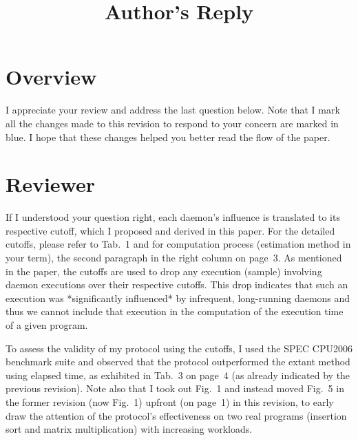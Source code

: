 \documentclass[10pt,letterpaper]{article}
\newenvironment{myindentpar}[1]%
{\begin{list}{}
         {\vspace{10pt}
					\setlength{\leftmargin}{#1}}
          \item[]
}
{\end{list}}
\newcommand{\rev}[1]{\begin{myindentpar}{.25in} {\em {\color{blue}{#1}}}\end{myindentpar}}
\begin{document}
\title{Author's Reply}
\author{}
\maketitle

\section*{Overview}\label{sec:overview}
I appreciate your review and address the last question below. 
Note that I mark all the changes made to this revision to respond to your concern are marked in {\color{blue}blue}. 
I hope that these changes helped you better read the flow of the paper. 



\clearpage
\section*{Reviewer}\label{sec:rev1}

\rev{
$<<$ Reviewer's comments to the author(s) $>>$

The manuscript is well revised.

However, I have a question how to estimate each daemon's influence as time.
The estimation is important for accuracy of your proposed method.

For acceptance, please clarify the estimation method and its validity.

}

If I understood your question right, 
each daemon's influence is translated to its respective cutoff, which I proposed and derived in this paper. 
For the detailed cutoffs, please refer to Tab.~1 and for computation process (estimation method in your term), the second paragraph in the right column on page~3.
As mentioned in the paper, the cutoffs are used to drop any execution (sample) involving daemon executions 
over their respective cutoffs. This drop indicates that such an execution was *significantly influenced* by infrequent, long-running daemons and thus we cannot include 
that execution in the computation of the execution time of a given program.

To assess the validity of my protocol using the cutoffs, I used the SPEC CPU2006 benchmark suite and observed that the protocol 
outperformed the extant method using elapsed time, as exhibited in Tab.~3 on page~4 (as already indicated by the previous revision). 
Note also that I took out Fig.~1 and instead moved Fig.~5 in the former revision (now Fig.~1) upfront (on page~1) in this revision, 
to early draw the attention of the protocol's effectiveness on two real programs (insertion sort and matrix multiplication) with increasing workloads.
\end{document}
